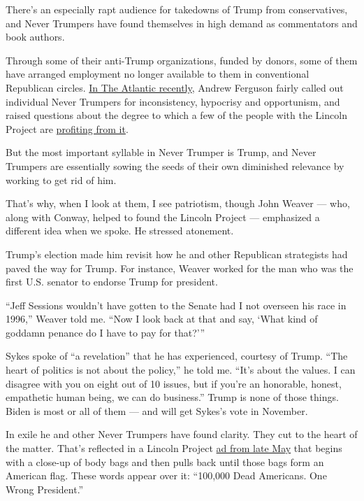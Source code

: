 There's an especially rapt audience for takedowns of Trump from
conservatives, and Never Trumpers have found themselves in high demand
as commentators and book authors.

Through some of their anti-Trump organizations, funded by donors, some
of them have arranged employment no longer available to them in
conventional Republican circles.
\href{https://www.theatlantic.com/ideas/archive/2020/06/tactics-lincoln-project/613636/}{In
The Atlantic recently}, Andrew Ferguson fairly called out individual
Never Trumpers for inconsistency, hypocrisy and opportunism, and raised
questions about the degree to which a few of the people with the Lincoln
Project are
\href{https://www.opensecrets.org/news/2020/05/lincoln-project-capitalizes-on-trump-rage/}{profiting
from it}.

But the most important syllable in Never Trumper is Trump, and Never
Trumpers are essentially sowing the seeds of their own diminished
relevance by working to get rid of him.

That's why, when I look at them, I see patriotism, though John Weaver
--- who, along with Conway, helped to found the Lincoln Project ---
emphasized a different idea when we spoke. He stressed atonement.

Trump's election made him revisit how he and other Republican
strategists had paved the way for Trump. For instance, Weaver worked for
the man who was the first U.S. senator to endorse Trump for president.

``Jeff Sessions wouldn't have gotten to the Senate had I not overseen
his race in 1996,'' Weaver told me. ``Now I look back at that and say,
`What kind of goddamn penance do I have to pay for that?'''

Sykes spoke of ``a revelation'' that he has experienced, courtesy of
Trump. ``The heart of politics is not about the policy,'' he told me.
``It's about the values. I can disagree with you on eight out of 10
issues, but if you're an honorable, honest, empathetic human being, we
can do business.'' Trump is none of those things. Biden is most or all
of them --- and will get Sykes's vote in November.

In exile he and other Never Trumpers have found clarity. They cut to the
heart of the matter. That's reflected in a Lincoln Project
\href{https://www.youtube.com/watch?v=hitGT3TkP9s}{ad from late May}
that begins with a close-up of body bags and then pulls back until those
bags form an American flag. These words appear over it: ``100,000 Dead
Americans. One Wrong President.''

